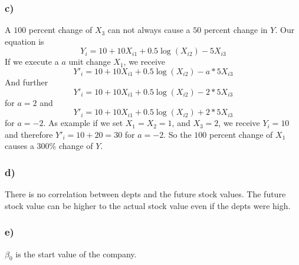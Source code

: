 \documentclass[a4paper]{article}
\begin{document}
        \subsubsection*{c)}
            A $100$ percent change of $X_3$ can not always cause a $50$ percent change in $Y$.
            Our equation is
            $$Y_i = 10 + 10 X_{i1} + 0.5 \log(X_{i2}) - 5 X_{i3}$$
            If we execute a $a$ unit change $X_1$, we receive
            $$Y'_i = 10 + 10 X_{i1} + 0.5 \log(X_{i2}) - a * 5 X_{i3}$$
            And further
            $$Y'_i = 10 + 10 X_{i1} + 0.5 \log(X_{i2}) - 2 * 5 X_{i3}$$
            for $a=2$ and
            $$Y'_i = 10 + 10 X_{i1} + 0.5 \log(X_{i2}) + 2 * 5 X_{i3}$$
            for $a=-2$.
            As example if we set $X_1 = X_2 = 1$, and $X_3 = 2$, we receive $Y_i = 10$ and therefore $Y'_i = 10 + 20 = 30$ for $a=-2$.
            So the $100$ percent change of $X_1$ causes a $300\%$ change of $Y$.

        \subsubsection*{d)}
            There is no correlation between depts and the future stock values.
            The future stock value can be higher to the actual stock value even if the depts were high.
        
        \subsubsection*{e)}
            $\beta_0$ is the start value of the company.
        
\end{document}
